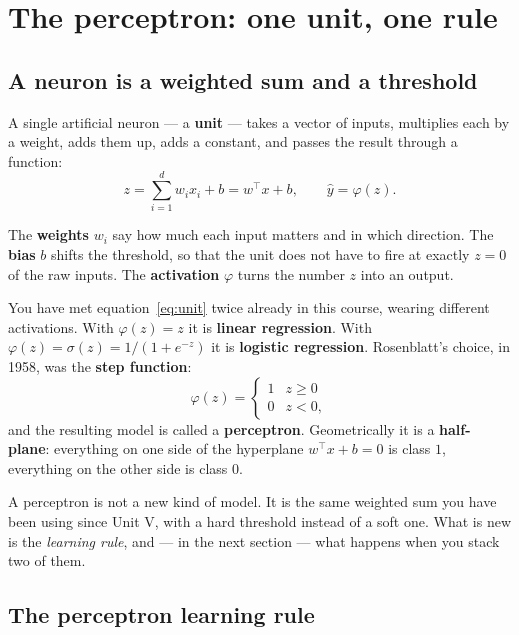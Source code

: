 \documentclass[11pt]{article}
\begin{document}
\section{The perceptron: one unit, one rule}
\label{sec:perc}

\subsection{A neuron is a weighted sum and a threshold}

A single artificial neuron --- a \textbf{unit} --- takes a vector of inputs,
multiplies each by a weight, adds them up, adds a constant, and passes the
result through a function:
\begin{equation}
  z = \sum_{i=1}^{d} w_i x_i + b = w^\top x + b,
  \qquad
  \hat y = \varphi(z).
  \label{eq:unit}
\end{equation}

The \textbf{weights} $w_i$ say how much each input matters and in which
direction. The \textbf{bias} $b$ shifts the threshold, so that the unit does
not have to fire at exactly $z = 0$ of the raw inputs. The
\textbf{activation} $\varphi$ turns the number $z$ into an output.

You have met equation~\eqref{eq:unit} twice already in this course, wearing
different activations. With $\varphi(z) = z$ it is \textbf{linear
regression}. With $\varphi(z) = \sigma(z) = 1/(1+e^{-z})$ it is
\textbf{logistic regression}. Rosenblatt's choice, in 1958, was the
\textbf{step function}:
\[
  \varphi(z) = \begin{cases} 1 & z \ge 0\\ 0 & z < 0,\end{cases}
\]
and the resulting model is called a \textbf{perceptron}. Geometrically it is a
\textbf{half-plane}: everything on one side of the hyperplane
$w^\top x + b = 0$ is class $1$, everything on the other side is class $0$.

\begin{keyidea}
A perceptron is not a new kind of model. It is the same weighted sum you have
been using since Unit V, with a hard threshold instead of a soft one. What is
new is the \emph{learning rule}, and --- in the next section --- what happens
when you stack two of them.
\end{keyidea}

\subsection{The perceptron learning rule}
\label{sec:percrule}
\end{document}
